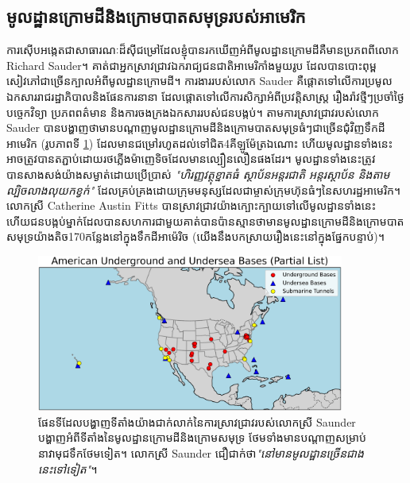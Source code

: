 \documentclass[10pt,twocolumn,letterpaper]{article}
\begin{document}
\subsection{មូលដ្ឋានក្រោមដីនិងក្រោមបាតសមុទ្ររបស់អាមេរិក}

	ការស៊ើបអង្កេតជាសាធារណៈដ៏សុីជម្រៅដែលខ្ញុំបានរកឃើញអំពីមូលដ្ឋានក្រោមដីគឺមានប្រភពពីលោក Richard Sauder។ គាត់ជាអ្នកស្រាវជ្រាវឯករាជ្យជនជាតិអាមេរិកាំងមួយរូប ដែលបានបោះពុម្ពសៀវភៅជាច្រើនក្បាលអំពីមូលដ្ឋានក្រោមដី\cite{22}។ ការងាររបស់លោក Sauder គឺផ្តោតទៅលើការប្រមូលឯកសាររាជរដ្ឋាភិបាលនិងផែនការនានា ដែលផ្តោតទៅលើការសិក្សាអំពីប្រវត្តិសាស្ត្រ រឿងរ៉ាវថ្មីៗប្រចាំថ្ងៃ បច្ចេកវិទ្យា ប្រភពពត៌មាន និងការចងក្រងឯកសាររបស់ជនបង្កប់។ តាមការស្រាវជ្រាវរបស់លោក Sauder បានបង្ហាញថាមានបណ្តាញមូលដ្ឋានក្រោមដីនិងក្រោមបាតសមុទ្រធំៗជាច្រើនជុំវិញទឹកដីអាមេរិក (រូបភាពទី \ref{fig:4}) ដែលមានជម្រៅរហូតដល់ទៅជិត4គីឡូម៉ែត្រឯណោះ ហើយមូលដ្ឋានទាំងនេះអាចត្រូវបានតភ្ជាប់ដោយរថភ្លើងម៉ាញេទិចដែលមានល្បឿនលឿនផងដែរ។ មូលដ្ឋានទាំងនេះ​ត្រូវបានសាងសង់យ៉ាងសម្ងាត់ដោយប្រើប្រាស់ \textit{"ហិរញ្ញវត្ថុខ្នាតធំ​ ស្ថាប័នអន្តរជាតិ អន្តរស្ថាប័ន និងតាមល្បិចលាងលុយកខ្វក់"} ដែលគ្រប់គ្រងដោយក្រុមមនុស្សដែលជាម្ចាស់ក្រុមហ៊ុនធំៗនៃសហរដ្ឋអាមេរិក\cite{22}។ លោកស្រី Catherine Austin Fitts បានស្រាវជ្រាវយ៉ាងក្បោះក្បាយទៅលើមូលដ្ឋានទាំងនេះ ហើយជនបង្កប់ម្នាក់ដែលបានសហការជាមួយគាត់បានប៉ានស្មានថាមានមូលដ្ឋានក្រោមដីនិងក្រោមបាតសមុទ្រយ៉ាងតិច170កន្លែងនៅក្នុងទឹកដីអាម៉េរិច (យើងនឹងបកស្រាយរឿងនេះនៅក្នុងផ្នែកបន្ទាប់)\cite{16,20}។

\begin{figure}[t]
\begin{center}
\includegraphics[width=0.9\textwidth]{basescrop.png}
\end{center}
\caption{ផែនទីដែលបង្ហាញទីតាំងយ៉ាងជាក់លាក់នៃការស្រាវជ្រាវរបស់លោកស្រី​ Saunder បង្ហាញអំពីទីតាំងនៃមូលដ្ឋានក្រោមដីនិងក្រោមសមុទ្រ ថែមទាំងមានបណ្តាញសម្រាប់នាវាមុជទឹកថែមទៀត។ លោកស្រី Saunder ជឿជាក់ថា\textit{"នៅមានមូលដ្ឋានច្រើនជាងនេះទៅទៀត"}\cite{22}។}
\label{fig:4}
\end{figure}
\end{document}
